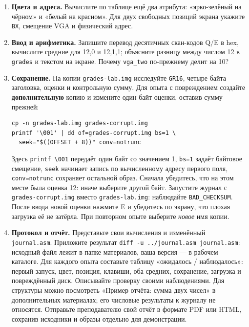 \begin{enumerate}
  \textbf{Вопросы к лекции №5.} Что здесь является исходным файлом, что
  --- исполняемым файлом на диске, а когда существует процесс? Почему
  \texttt{./memory} запускается в Linux, а \texttt{hello.bin}
  исполняется только после загрузки BIOS в QEMU? Кто предоставляет
  программе адресное пространство и возвращает оболочке код завершения?
  На следующей теме разберём загрузку программы, процессы и услуги
  операционной системы.
\item
  \textbf{Цвета и адреса.} Вычислите по таблице ещё два атрибута:
  «ярко-зелёный на чёрном» и «белый на красном». Для двух свободных
  позиций экрана укажите \texttt{BX}, смещение VGA и физический адрес.
\item
  \textbf{Ввод и арифметика.} Запишите перевод десятичных скан-кодов Q/E
  в hex, вычислите средние для 12,0 и 12,1,1; объясните разницу между
  числом 12 в \texttt{grades} и текстом на экране. Почему
  \texttt{vga\_two} по-прежнему делит на 10?
\item
  \textbf{Сохранение.} На копии \texttt{grades-lab.img} исследуйте
  \texttt{GR16}, четыре байта заголовка, оценки и контрольную сумму. Для
  опыта с повреждением создайте \textbf{дополнительную} копию и измените
  один байт оценки, оставив сумму прежней:

\begin{verbatim}
cp -n grades-lab.img grades-corrupt.img
printf '\001' | dd of=grades-corrupt.img bs=1 \
  seek="$((OFFSET + 8))" conv=notrunc
\end{verbatim}

  Здесь
  \texttt{printf\ \textquotesingle{}\textbackslash{}001\textquotesingle{}}
  передаёт один байт со значением 1, \texttt{bs=1} задаёт байтовое
  смещение, \texttt{seek} начинает запись по вычисленному адресу первого
  поля, \texttt{conv=notrunc} сохраняет остальной образ. Сначала
  убедитесь, что на этом месте была оценка 12: иначе выберите другой
  байт. Запустите журнал с \texttt{grades-corrupt.img} вместо
  \texttt{grades-lab.img}: наблюдайте \texttt{BAD\_CHECKSUM}. После
  ввода новой оценки нажмите E и убедитесь по экрану, что плохая
  загрузка её не затёрла. При повторном опыте выберите \emph{новое} имя
  копии.
\item
  \textbf{Протокол и отчёт.} Представьте свои вычисления и изменённый
  \texttt{journal.asm}. Приложите результат
  \texttt{diff\ -u\ ../journal.asm\ journal.asm}: исходный файл лежит в
  папке материалов, ваша версия --- в рабочем каталоге. Для каждого
  опыта составьте таблицу «ожидалось / наблюдалось»: первый запуск,
  цвет, позиция, клавиши, оба средних, сохранение, загрузка и
  повреждённый диск. Описывайте проверку своими наблюдениями. Для
  структуры можно посмотреть «Пример отчёта: сумма двух чисел» в
  дополнительных материалах; его числовые результаты к журналу не
  относятся. Отправьте преподавателю свой отчёт в формате PDF или HTML,
  сохранив исходники и образы отдельно для демонстрации.
\end{enumerate}

